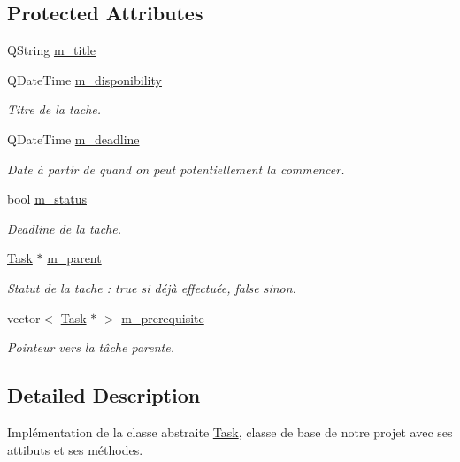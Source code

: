 \subsection*{Protected Attributes}
\begin{DoxyCompactItemize}
\item 
Q\+String \hyperlink{class_task_aa9c0fa08a6d4bb6b7390b69ba15baff2}{m\+\_\+title}
\item 
Q\+Date\+Time \hyperlink{class_task_aede98e97b4be2a2b146eddb761619a6c}{m\+\_\+disponibility}
\begin{DoxyCompactList}\small\item\em Titre de la tache. \end{DoxyCompactList}\item 
Q\+Date\+Time \hyperlink{class_task_ad8c46e8e9af82fa4315d77679af7619b}{m\+\_\+deadline}
\begin{DoxyCompactList}\small\item\em Date à partir de quand on peut potentiellement la commencer. \end{DoxyCompactList}\item 
bool \hyperlink{class_task_a1036ac363062b06e1abf7b7d6cbcb048}{m\+\_\+status}
\begin{DoxyCompactList}\small\item\em Deadline de la tache. \end{DoxyCompactList}\item 
\hyperlink{class_task}{Task} $\ast$ \hyperlink{class_task_ab7653d17e9111aab6f5664d68815e5be}{m\+\_\+parent}
\begin{DoxyCompactList}\small\item\em Statut de la tache \+: true si déjà effectuée, false sinon. \end{DoxyCompactList}\item 
vector$<$ \hyperlink{class_task}{Task} $\ast$ $>$ \hyperlink{class_task_a1d612002385787e4eedd460704d54ded}{m\+\_\+prerequisite}
\begin{DoxyCompactList}\small\item\em Pointeur vers la tâche parente. \end{DoxyCompactList}\end{DoxyCompactItemize}


\subsection{Detailed Description}
Implémentation de la classe abstraite \hyperlink{class_task}{Task}, classe de base de notre projet avec ses attibuts et ses méthodes. 

